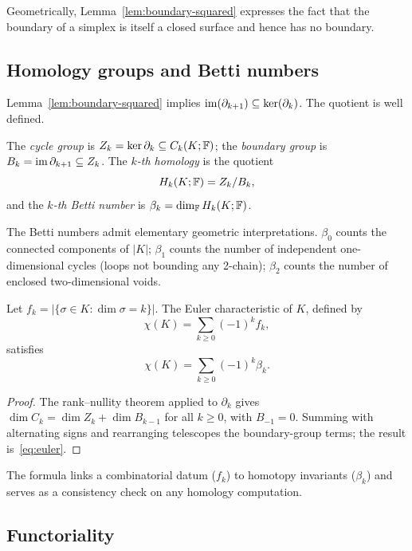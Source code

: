 Geometrically, Lemma~\ref{lem:boundary-squared} expresses the fact that the boundary of a simplex is itself a closed surface and hence has no boundary.

\subsection{Homology groups and Betti numbers}

Lemma~\ref{lem:boundary-squared} implies $\operatorname{im}(\partial_{k+1})\subseteq\ker(\partial_k)$. The quotient is well defined.

\begin{definition}
\label{def:homology}
The \emph{cycle group} is $Z_k=\ker\partial_k\subseteq C_k(K;\mathbb{F})$; the \emph{boundary group} is $B_k=\operatorname{im}\partial_{k+1}\subseteq Z_k$. The \emph{$k$-th homology} is the quotient
\[
  H_k(K;\mathbb{F})=Z_k/B_k,
\]
and the \emph{$k$-th Betti number} is $\beta_k=\dim_{\mathbb{F}} H_k(K;\mathbb{F})$.
\end{definition}

The Betti numbers admit elementary geometric interpretations. $\beta_0$ counts the connected components of $|K|$; $\beta_1$ counts the number of independent one-dimensional cycles (loops not bounding any 2-chain); $\beta_2$ counts the number of enclosed two-dimensional voids.

\begin{theorem}
\label{thm:euler}
Let $f_k=|\{\sigma\in K:\dim\sigma=k\}|$. The Euler characteristic of $K$, defined by
\[
  \chi(K)=\sum_{k\geq 0}(-1)^k f_k,
\]
satisfies
\begin{equation}
  \chi(K)=\sum_{k\geq 0}(-1)^k\beta_k.
  \label{eq:euler}
\end{equation}
\end{theorem}

\begin{proof}
The rank--nullity theorem applied to $\partial_k$ gives $\dim C_k=\dim Z_k+\dim B_{k-1}$ for all $k\geq 0$, with $B_{-1}=0$. Summing with alternating signs and rearranging telescopes the boundary-group terms; the result is~\eqref{eq:euler}.
\end{proof}

The formula links a combinatorial datum ($f_k$) to homotopy invariants ($\beta_k$) and serves as a consistency check on any homology computation.

\subsection{Functoriality}

